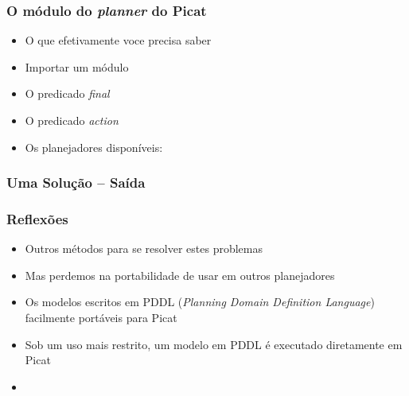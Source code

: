 \begin{frame}[fragile]
 \frametitle{O módulo do \textit{planner} do Picat}

\begin{itemize}
  \item O que efetivamente voce precisa saber
  \pause
  \item Importar um módulo 
  \pause
  \item O predicado \textit{final}
    \pause
  \item O predicado \textit{action}
    \pause
  \item Os planejadores disponíveis: 
\end{itemize}
\end{frame}




\begin{frame}[fragile]
\frametitle{Uma Soluç\~ao -- Saída}

\begin{figure}[!htb]
\centering
\end{figure}

\end{frame}


\begin{frame}[fragile]
\frametitle{Reflexões}


\begin{itemize}
  \item Outros métodos para se resolver estes problemas
  \pause
  \item Mas perdemos na portabilidade de usar em outros planejadores
  \pause
  \item Os modelos escritos em PDDL (\textit{Planning Domain Definition Language})
  facilmente portáveis para Picat
    \pause
  \item Sob um uso mais restrito, um modelo em PDDL é executado diretamente em Picat
    \pause
  \item 
\end{itemize}

\end{frame}






